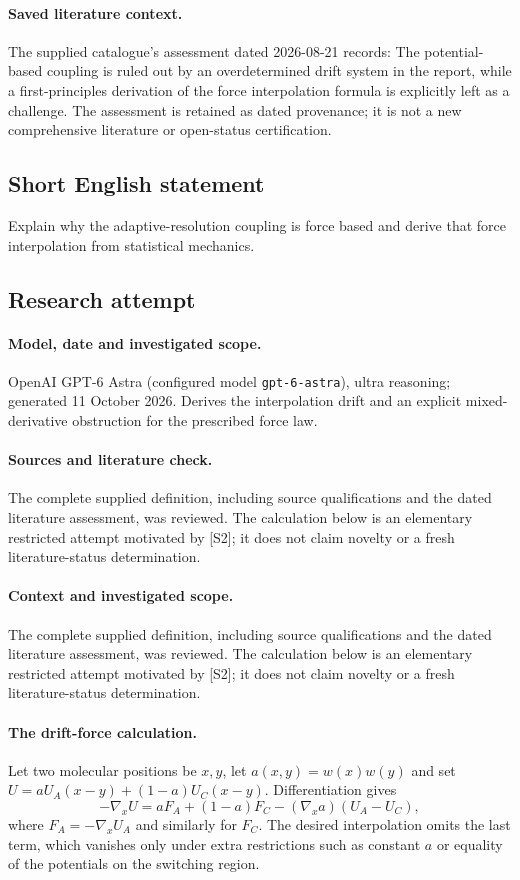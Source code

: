 \documentclass[11pt]{article}
\begin{document}
\paragraph{Saved literature context.} The supplied catalogue's assessment dated 2026-08-21 records: The potential-based coupling is ruled out by an overdetermined drift system in the report, while a first-principles derivation of the force interpolation formula is explicitly left as a challenge. The assessment is retained as dated provenance; it is not a new comprehensive literature or open-status certification.
\subsection{Short English statement}
Explain why the adaptive-resolution coupling is force based and derive that force interpolation from statistical mechanics.
\subsection{Research attempt}
\paragraph{Model, date and investigated scope.}
OpenAI GPT-6 Astra (configured model \texttt{gpt-6-astra}), ultra reasoning; generated 11 October 2026. Derives the interpolation drift and an explicit mixed-derivative obstruction for the prescribed force law.

\paragraph{Sources and literature check.}
The complete supplied definition, including source qualifications and the dated literature assessment, was reviewed. The calculation below is an elementary restricted attempt motivated by [S2]; it does not claim novelty or a fresh literature-status determination.

\paragraph{Context and investigated scope.} The complete supplied definition, including source qualifications and the dated literature assessment, was reviewed. The calculation below is an elementary restricted attempt motivated by [S2]; it does not claim novelty or a fresh literature-status determination.

\paragraph{The drift-force calculation.} Let two molecular positions be $x,y$, let $a(x,y)=w(x)w(y)$ and set $U=aU_A(x-y)+(1-a)U_C(x-y)$. Differentiation gives
\[
 -\nabla_xU=aF_A+(1-a)F_C-(\nabla_xa)(U_A-U_C),
\]
where $F_A=-\nabla_xU_A$ and similarly for $F_C$. The desired interpolation omits the last term, which vanishes only under extra restrictions such as constant $a$ or equality of the potentials on the switching region.
\end{document}
